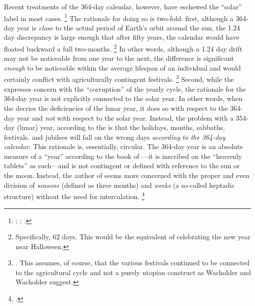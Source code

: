 Recent treatments of the 364-day calendar, however, have eschewed the ``solar'' label in most cases.%
    \footnote{%
        \cite[231]{glessmer_flint-vanderkam1999};
        \cite[80]{bendov_steele2011};
        \cite[438]{jacobus_brooke-hempel2018}.}
The rationale for doing so is two-fold: first, although a 364-day year is \emph{close} to the actual period of Earth's orbit around the sun, the 1.24 day discrepancy is large enough that after fifty years, the calendar would have floated backward a full two-months.%
    \footnote{Specifically, 62 days. This would be the equivalent of celebrating the new year near Halloween.}
In other words, although a 1.24 day drift may not be noticeable from one year to the next, the difference is significant \emph{enough} to be noticeable within the average lifespan of an individual and would certainly conflict with agriculturally contingent festivals.%
    \footnote{\cite[28--37]{wacholder-wacholder_huca1995}. This assumes, of course, that the various festivals continued to be connected to the agricultural cycle and not a purely utopian construct as Wacholder and Wacholder suggest.}
Second, while the \ap expresses concern with the ``corruption'' of the yearly cycle, the rationale for the 364-day year is not explicitly connected to the solar year. In other words, when the \ap decries the deficiencies of the lunar year, it does so with respect to the 364-day year and \emph{not} with respect to the solar year. Instead, the problem with a 354-day (lunar) year, according to the \ap is that the holidays, months, sabbaths, festivals, and jubilees will fall on the wrong days \emph{according to the 364-day calendar}. This rationale is, essentially, circular. The 364-day year is an absolute measure of a ``year'' according to the book of \jub---it is inscribed on the ``heavenly tablets'' as such---and is not contingent or defined with reference to the sun or the moon. Instead, the author of \jub seems more concerned with the proper and even division of \emph{seasons} (defined as three months) and \emph{weeks} (a so-called heptadic structure) without the need for intercalation.%
    \footnote{\cite[125]{bendov-saulnier_cbr2008}.}

